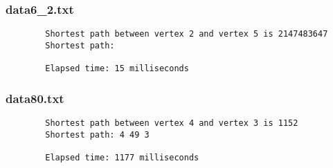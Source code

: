 \documentclass{article}
\begin{document}
    \subsubsection*{data6_2.txt}
    \begin{verbatim}
        Shortest path between vertex 2 and vertex 5 is 2147483647
        Shortest path:

        Elapsed time: 15 milliseconds
    \end{verbatim}

    \subsubsection*{data80.txt}
    \begin{verbatim}
        Shortest path between vertex 4 and vertex 3 is 1152
        Shortest path: 4 49 3

        Elapsed time: 1177 milliseconds
    \end{verbatim}
\end{document}
